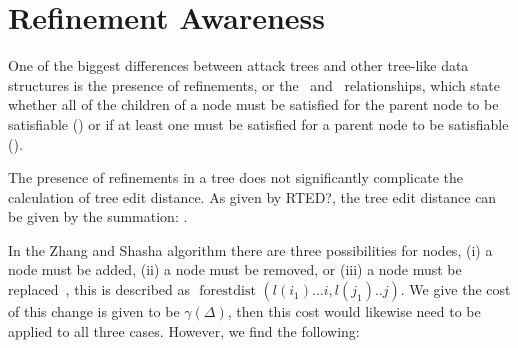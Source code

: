 \section{Refinement Awareness}

One of the biggest differences between attack trees and other tree-like data structures is the presence of refinements, or the \AND\ and \OR\ relationships, which state whether all of the children of a node must be satisfied for the parent node to be satisfiable (\AND) or if at least one must be satisfied for a parent node to be satisfiable (\OR).

The presence of refinements in a tree does not significantly complicate the calculation of tree edit distance. As given by RTED?, the tree edit distance can be given by the summation: .

In the Zhang and Shasha algorithm there are three possibilities for nodes, (i) a node must be added, (ii) a node must be removed, or (iii) a node must be replaced~\cite{zhang_simple_1989}, this is described as $\text { forestdist }\left(l\left(i_1\right) \ldots i, l\left(j_1\right) . . j\right)$. We give the cost of this change is given to be $\gamma(\Delta)$, then this cost would likewise need to be applied to all three cases. However, we find the following:



